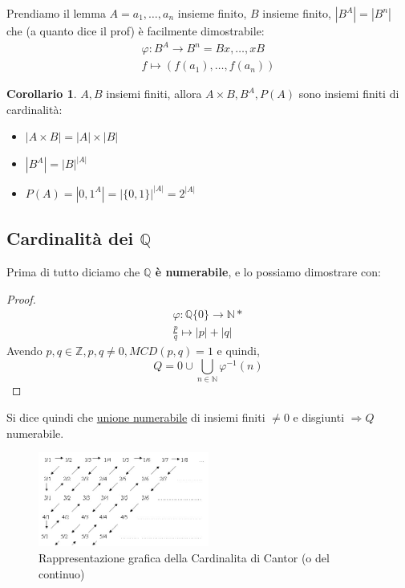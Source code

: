 \documentclass{article}
\theoremstyle{definition}
\newtheorem{corollario}{Corollario}[section]
\begin{document}
Prendiamo il lemma $A = {a_1,\ldots,a_n}$ insieme finito, $B$ insieme finito, $|B^A| = |B^n|$ che (a quanto dice il prof) è facilmente dimostrabile:
\begin{align*}
         \varphi : B^A \to B^n = Bx,\ldots,xB \\
                   f \mapsto (f(a_1),\ldots,f(a_n))
\end{align*}

\begin{tcolorbox}
\begin{corollario}
$A,B$ insiemi finiti, allora $A \times B, B^A, P(A)$ sono insiemi finiti di cardinalità:
\begin{itemize}
        \item $|A \times B| = |A| \times |B|$	
        \item $|B^A| = |B|^{|A|}$
        \item $P(A) = |{0,1}^A| = |\{0,1\}|^{|A|} = 2^{|A|}$	
\end{itemize}
\end{corollario}        
\end{tcolorbox}


\subsection{Cardinalità dei $\mathbb{Q}$}\label{sec:cardinalita_dei_Q}
Prima di tutto diciamo che \textbf{$\mathbb{Q}$ è numerabile}, e lo possiamo dimostrare con:
\begin{tcolorbox}
\begin{proof}
\begin{align*}
        \varphi : \mathbb{Q}\{0\} \to \mathbb{N}* \\
        \frac{p}{q} \mapsto |p| + |q|
\end{align*}
Avendo $p,q \in \mathbb{Z}, p,q \not = 0, MCD(p,q)=1$ e quindi,\[Q={0}\cup\bigcup_{n\in\mathbb{N}}\varphi^{-1}(n)\]
\end{proof}
\end{tcolorbox}

Si dice quindi che \underline{unione numerabile} di insiemi finiti $\not = 0$ e disgiunti $\Rightarrow Q $ numerabile. \newline
\begin{figure}[h]
        \centering
                \includegraphics[width=0.5\textwidth]{cardinalita_cantor.jpeg}
                \caption{Rappresentazione grafica della Cardinalita di Cantor (o del continuo)}\label{fig:cardinalita_cantor}
\end{figure}
\end{document}
